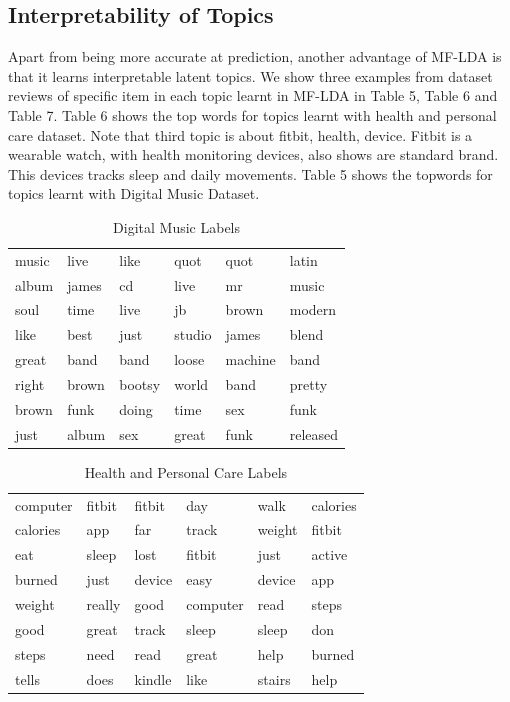 \documentclass[10pt,conference]{IEEEtran}
\begin{document}
\subsection{Interpretability of Topics}
Apart from being more accurate at pred​iction, another advantage of MF-LDA is that it learns interpretable latent topics. We show three examples from dataset reviews of specific item in each topic learnt in MF-LDA in Table 5, Table 6 and Table 7. Table 6 shows the top words for topics learnt with health and personal care dataset. Note that third topic is about fitbit, health, device. Fitbit is a wearable watch, with health monitoring devices, also shows are standard brand. This devices tracks sleep and daily movements. Table 5 shows the topwords for topics learnt with Digital Music Dataset.

\begin{table}[h]
\centering
\caption{Digital Music Labels}
\label{Digital Music Labels}
\begin{tabular}{ llllll }
\toprule
music  & live  & like  & quot  & quot & latin \\
album  & james  & cd  & live  & mr & music \\
soul   & time  & live  & jb  & brown & modern \\ 
like  & best  & just  & studio  & james & blend \\ 
great    & band  & band  & loose  & machine & band \\ 
right  & brown & bootsy  & world & band & pretty \\ 
brown   & funk  & doing  &  time  &  sex & funk \\ 
just   & album  & sex & great &  funk & released \\ 
\toprule          
\end{tabular}
\end{table}


\begin{table}[h]
\centering
\caption{Health and Personal Care Labels}
\label{Health and Personal Care Labels}
\begin{tabular}{ llllll }
\toprule
computer & fitbit & fitbit & day & walk & calories \\
calories & app & far & track & weight & fitbit \\
eat & sleep & lost & fitbit & just & active \\
burned & just & device & easy & device & app \\
weight & really & good & computer & read & steps \\
good & great & track & sleep & sleep & don \\
steps & need & read & great & help & burned \\
tells & does & kindle & like & stairs & help \\
\toprule          
\end{tabular}
\end{table}
\end{document}
